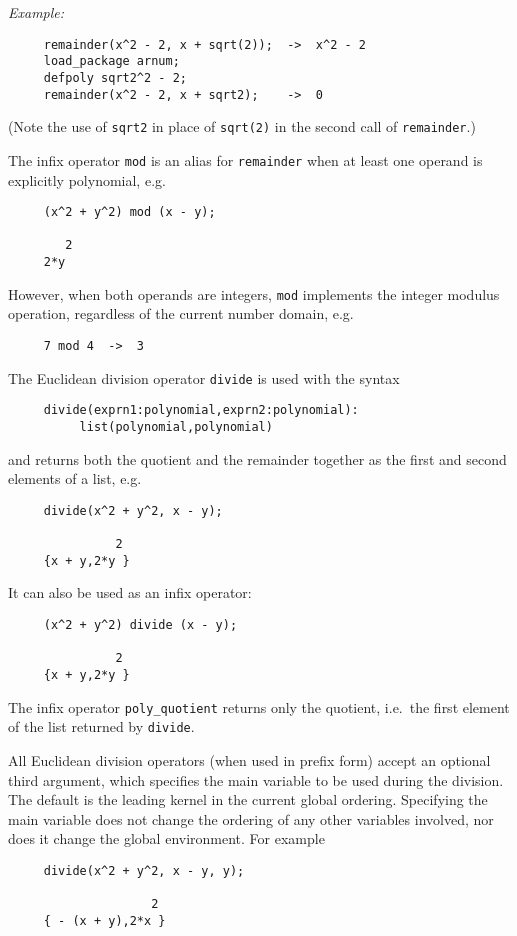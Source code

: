 \textit{Example:}
\begin{verbatim}
     remainder(x^2 - 2, x + sqrt(2));  ->  x^2 - 2
     load_package arnum;
     defpoly sqrt2^2 - 2;
     remainder(x^2 - 2, x + sqrt2);    ->  0
\end{verbatim}
(Note the use of \texttt{sqrt2} in place of \texttt{sqrt(2)} in the
second call of \texttt{remainder}.)

The infix operator \texttt{mod} is an alias for \texttt{remainder}
when at least one operand is explicitly polynomial, e.g.
\begin{verbatim}
     (x^2 + y^2) mod (x - y);

        2
     2*y
\end{verbatim}
However, when both operands are integers, \texttt{mod} implements the
integer modulus operation, regardless of the current number domain,
e.g.
\begin{verbatim}
     7 mod 4  ->  3
\end{verbatim}

The Euclidean division operator \texttt{divide} is used with the syntax
\begin{verbatim}
     divide(exprn1:polynomial,exprn2:polynomial):
          list(polynomial,polynomial)
\end{verbatim}
and returns both the quotient and the remainder together as the first
and second elements of a list, e.g.
\begin{verbatim}
     divide(x^2 + y^2, x - y);

               2
     {x + y,2*y }
\end{verbatim}
It can also be used as an infix operator:
\begin{verbatim}
     (x^2 + y^2) divide (x - y);

               2
     {x + y,2*y }
\end{verbatim}
The infix operator \texttt{poly\_quotient} returns only the quotient,
i.e.\ the first element of the list returned by \texttt{divide}.

All Euclidean division operators (when used in prefix form) accept an
optional third argument, which specifies the main variable to be used
during the division.  The default is the leading kernel in the current
global ordering.  Specifying the main variable does not change the
ordering of any other variables involved, nor does it change the
global environment.  For example
\begin{verbatim}
     divide(x^2 + y^2, x - y, y);

                    2
     { - (x + y),2*x }
\end{verbatim}

